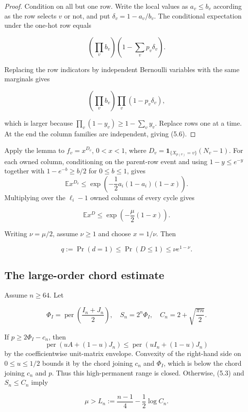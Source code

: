 \documentclass[11pt]{article}
\begin{document}
\begin{proof}


Condition on all but one row.  Write the local values as $a_v\le b_v$ according as
the row selects $v$ or not, and put $\delta_v=1-a_v/b_v$.  The conditional
expectation under the one-hot row equals

\[
\left(\prod_vb_v\right)\left(1-\sum_vp_v\delta_v\right).
\]

Replacing the row indicators by independent Bernoulli variables with the same
marginals gives

\[
\left(\prod_vb_v\right)\prod_v(1-p_v\delta_v),
\]

which is larger because $\prod_v(1-y_v)\ge1-\sum_vy_v$.  Replace rows one at a
time.  At the end the column families are independent, giving (5.6).
\end{proof}


Apply the lemma to $f_v=x^{D_v}$, $0<x<1$, where
$D_v=\mathbf1_{\{X_{p(v)}=v\}}(N_v-1)$.
For each owned column, conditioning on the parent-row event and using
$1-y\le e^{-y}$ together with $1-e^{-b}\ge b/2$ for
$0\le b\le1$, gives
\[
\mathbb E x^{D_v}\le
\exp\left(-\frac12a_i(1-a_i)(1-x)\right).
\]
Multiplying over the $\ell_i-1$ owned columns of every cycle gives

\[
\mathbb Ex^D\le\exp\left(-\frac\mu2(1-x)\right). \tag{5.7}
\]

Writing $\nu=\mu/2$, assume $\nu\ge1$ and choose $x=1/\nu$.  Then

\[
q:=\Pr(d=1)\le\Pr(D\le1)\le\nu e^{1-\nu}. \tag{5.8}
\]

\subsection{The large-order chord estimate}


Assume $n\ge64$.  Let

\[
\Phi_I=\operatorname{per}\left(\frac{I_n+J_n}{2}\right),
\quad S_n=2^n\Phi_I,
\quad C_n=2+\sqrt{\frac{\pi n}{2}}.
\]

If $p\ge2\Phi_I-c_n$, then
\[
\operatorname{per}(uA+(1-u)J_n)
\le\operatorname{per}(uI_n+(1-u)J_n)
\]
by the coefficientwise unit-matrix envelope.  Convexity of the right-hand side
on $0\le u\le1/2$ bounds it by the chord joining $c_n$ and
$\Phi_I$, which is below the chord joining $c_n$ and $p$.
Thus this high-permanent range is closed.  Otherwise, (5.3) and
$S_n\le C_n$ imply

\[
\mu>L_n:=\frac{n-1}{4}-\frac12\log C_n. \tag{5.9}
\]
\end{document}
